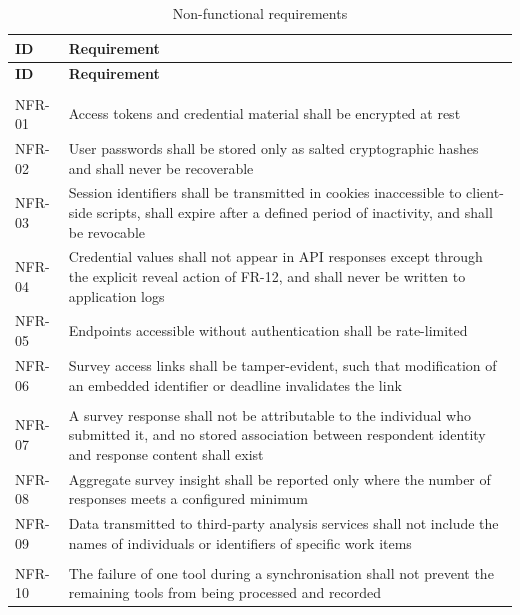 \begin{longtable}{
  >{\raggedright\arraybackslash}p{}
  >{\raggedright\arraybackslash}p{}
}
\caption{Non-functional requirements}
\label{tab:nfr}\\
\toprule
\textbf{ID} & \textbf{Requirement} \\
\midrule
\endfirsthead
\toprule
\textbf{ID} & \textbf{Requirement} \\
\midrule
\endhead
\bottomrule
\endlastfoot
\multicolumn{2}{l}{\textit{Security}} \\
\addlinespace
NFR-01 & Access tokens and credential material shall be encrypted at rest \\
\addlinespace
NFR-02 & User passwords shall be stored only as salted cryptographic hashes and shall
never be recoverable \\
\addlinespace
NFR-03 & Session identifiers shall be transmitted in cookies inaccessible to
client-side scripts, shall expire after a defined period of inactivity, and shall be
revocable \\
\addlinespace
NFR-04 & Credential values shall not appear in API responses except through the
explicit reveal action of FR-12, and shall never be written to application logs \\
\addlinespace
NFR-05 & Endpoints accessible without authentication shall be rate-limited \\
\addlinespace
NFR-06 & Survey access links shall be tamper-evident, such that modification of an
embedded identifier or deadline invalidates the link \\
\addlinespace
\multicolumn{2}{l}{\textit{Privacy}} \\
\addlinespace
NFR-07 & A survey response shall not be attributable to the individual who submitted
it, and no stored association between respondent identity and response content shall
exist \\
\addlinespace
NFR-08 & Aggregate survey insight shall be reported only where the number of
responses meets a configured minimum \\
\addlinespace
NFR-09 & Data transmitted to third-party analysis services shall not include the
names of individuals or identifiers of specific work items \\
\addlinespace
\multicolumn{2}{l}{\textit{Reliability}} \\
\addlinespace
NFR-10 & The failure of one tool during a synchronisation shall not prevent the
remaining tools from being processed and recorded \\

\end{longtable}
